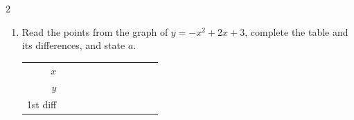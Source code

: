 \documentclass[11pt]{article}
\begin{document}
\begin{recapbox}
\begin{multicols}{2}
\begin{enumerate}[leftmargin=*,itemsep=3pt]
\begin{center}
\begin{tabular}
\end{tabular}\end{center}
  \item Read the points from the graph of $y=-x^2+2x+3$, complete the table and its differences, and state $a$.
\begin{center}\end{center}
\begin{center}\renewcommand{\arraystretch}{1.15}\setlength{\tabcolsep}{2pt}\begin{tabular}{r|>{\centering\arraybackslash}p{0.62cm}>{\centering\arraybackslash}p{0.62cm}>{\centering\arraybackslash}p{0.62cm}>{\centering\arraybackslash}p{0.62cm}>{\centering\arraybackslash}p{0.62cm}>{\centering\arraybackslash}p{0.62cm}>{\centering\arraybackslash}p{0.62cm}>{\centering\arraybackslash}p{0.62cm}>{\centering\arraybackslash}p{0.62cm}>{\centering\arraybackslash}p{0.62cm}}
$x$ & \multicolumn{2}{c}{\colorbox{iagreen}{\makebox[1.12cm]{\strut \color{white}\bfseries $-1$}}} & \multicolumn{2}{c}{\colorbox{iagreen}{\makebox[1.12cm]{\strut \color{white}\bfseries $0$}}} & \multicolumn{2}{c}{\colorbox{iagreen}{\makebox[1.12cm]{\strut \color{white}\bfseries $1$}}} & \multicolumn{2}{c}{\colorbox{iagreen}{\makebox[1.12cm]{\strut \color{white}\bfseries $2$}}} & \multicolumn{2}{c}{\colorbox{iagreen}{\makebox[1.12cm]{\strut \color{white}\bfseries $3$}}} \\[2pt]
$y$ & \multicolumn{2}{c}{\fbox{\makebox[0.94cm]{\strut}}} & \multicolumn{2}{c}{\fbox{\makebox[0.94cm]{\strut}}} & \multicolumn{2}{c}{\fbox{\makebox[0.94cm]{\strut}}} & \multicolumn{2}{c}{\fbox{\makebox[0.94cm]{\strut}}} & \multicolumn{2}{c}{\fbox{\makebox[0.94cm]{\strut}}} \\[2pt]
\textcolor{exblue}{\scriptsize 1st diff} & & \multicolumn{2}{c}{\fbox{\makebox[0.94cm]{\strut}}} & \multicolumn{2}{c}{\fbox{\makebox[0.94cm]{\strut}}} & \multicolumn{2}{c}{\fbox{\makebox[0.94cm]{\strut}}} & \multicolumn{2}{c}{\fbox{\makebox[0.94cm]{\strut}}} & \\[2pt]

\end{tabular}
\end{center}
\end{enumerate}
\end{multicols}
\end{recapbox}
\end{document}

